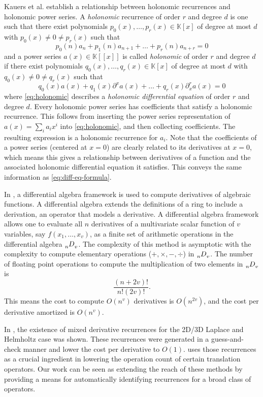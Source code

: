 \documentclass[12pt]{article}
\theoremstyle{definition}
\theoremstyle{plain}
\theoremstyle{definition}
\begin{document}
Kauers et al. \cite{kauers2011concrete} establish a relationship between holonomic recurrences and holonomic power series. A \textit{holonomic} recurrence of order $r$ and degree $d$ is one such that there exist polynomials $p_0(x), \dots, p_r(x) \in \mathbb{K}[x]$ of degree at most $d$ with $p_0(x) \ne 0 \ne p_r(x)$ such that
\[
p_0(n) a_n + p_1(n) a_{n+1} + \dots + p_r(n) a_{n+r} = 0
\]
and a power series $a(x) \in \mathbb{K}[[x]]$ is called \textit{holonomic} of order $r$ and degree $d$ if there exist polynomials $q_0(x), \dots, q_r(x) \in \mathbb{K}[x]$ of degree at most $d$ with $q_0(x) \ne 0 \ne q_r(x)$ such that
\begin{equation}
\label{eq:holonomic}
q_0(x) a(x) + q_1(x) \partial^x a(x) + \dots + q_r(x) \partial^r_x a(x) = 0
\end{equation}
where \eqref{eq:holonomic} describes a \textit{holonomic differential equation} of order $r$ and degree $d$.
Every holonomic power series has coefficients that satisfy a holonomic recurrence. This follows from inserting the power series representation of $a(x) = \sum_i a_i x^i$ into \eqref{eq:holonomic}, and then collecting coefficients. The resulting expression is a holonomic recurrence for $a_i$. Note that the coefficients of a power series (centered at $x=0$) are clearly related to its derivatives at $x=0$, which means this gives a relationship between derivatives of a function and the associated holonomic differential equation it satisfies. This conveys the same information as \eqref{eq:diff-eq-formula}.


In \cite{zhang2013fast}, a differential algebra framework is used to compute derivatives of algebraic functions. A differential algebra extends the definitions of a ring to include a derivation, an operator that models a derivative. A differential algebra framework 
allows one to evaluate all $n$ derivatives of a multivariate scalar function of $v$ variables, say $f(x_1, \dots, x_v)$, as a finite set of arithmetic operations in the differential algebra $\tensor*[^{}_n]{{D}}{^{}_v}$. The complexity of this method is asymptotic with the complexity to compute elementary operations ($+, \times, -, \div$) in $\tensor*[^{}_n]{{D}}{^{}_v}$. The number of floating point operations to compute the multiplication of two elements in $\tensor*[^{}_n]{{D}}{^{}_v}$  \cite{hawkes1999modern} is
\[
\frac{(n+2v)!}{n!(2v)!}.
\]
This means the cost to compute $O(n^v)$ derivatives is $O(n^{2v})$, and the cost per derivative amortized is $O(n^v)$.

In \cite{fernando2023automatic}, the existence of mixed derivative recurrences for the 2D/3D Laplace and Helmholtz case was shown. These recurrences were generated in a guess-and-check manner and lower the cost per derivative to $O(1)$. \cite{fernando2023automatic} uses those recurrences as a crucial ingredient in lowering the operation count of certain translation operators.
Our work can be seen as extending the reach of these methods by providing a means for automatically identifying
recurrences for a broad class of operators.
\end{document}
